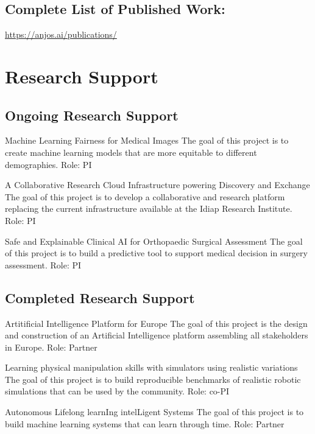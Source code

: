 \documentclass[a4paper]{nihbiosketch}
\begin{document}
\subsection*{Complete List of Published Work:}
\url{https://anjos.ai/publications/}

\section{Research Support}

\subsection*{Ongoing Research Support}


{Machine Learning Fairness for Medical Images}
{The goal of this project is to create machine learning models that are more
equitable to different demographies.}
{Role: PI}

\bigskip

{A Collaborative Research Cloud Infrastructure powering Discovery and Exchange}
{The goal of this project is to develop a collaborative and research platform
replacing the current infrastructure available at the Idiap Research Institute.}
{Role: PI}

\bigskip

{Safe and Explainable Clinical AI for Orthopaedic Surgical Assessment}
{The goal of this project is to build a predictive tool to support medical
decision in surgery assessment.}
{Role: PI}

\subsection*{Completed Research Support}

{Artitificial Intelligence Platform for Europe}
{The goal of this project is the design and construction of an Artificial
    Intelligence platform assembling all stakeholders in Europe.}
{Role: Partner}

\bigskip

{Learning physical manipulation skills with simulators using realistic variations}
{The goal of this project is to build reproducible benchmarks of realistic
robotic simulations that can be used by the community.}
{Role: co-PI}

\bigskip

{Autonomous Lifelong learnIng intelLigent Systems}
{The goal of this project is to build machine learning systems that can learn
through time.}
{Role: Partner}
\end{document}
